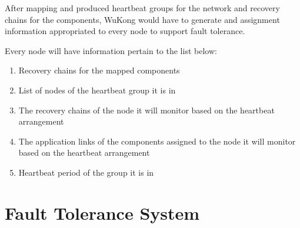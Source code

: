 After mapping and produced heartbeat groups for the network and recovery chains
for the components, WuKong would have to generate and assignment information
appropriated to every node to support fault tolerance.

Every node will have information pertain to the list below:

\begin{enumerate}
\item Recovery chains for the mapped components
\item List of nodes of the heartbeat group it is in
\item The recovery chains of the node it will monitor based on
the heartbeat arrangement
\item The application links of the components assigned to the node it will
monitor based on the heartbeat arrangement
\item Heartbeat period of the group it is in
\end{enumerate}




\section{Fault Tolerance System}

